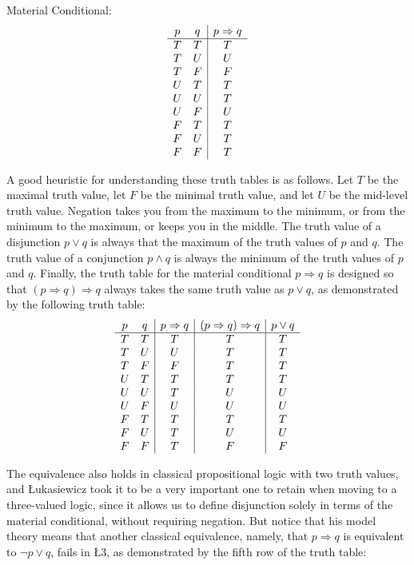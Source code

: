\documentclass[11pt]{article}
\theoremstyle{definition}
\theoremstyle{remark}
\begin{document}
\noindent
Material Conditional:
\[
\begin{array}{c c|c}
p & q & p \Rightarrow q \\
\hline
T & T & T \\
T & U & U \\
T & F & F \\
U & T & T \\
U & U & T \\
U & F & U \\
F & T & T \\
F & U & T \\
F & F & T \\
\end{array}
\]\par
\noindent
A good heuristic for understanding these truth tables is as follows. Let $T$ be the maximal truth value, let $F$ be the minimal truth value, and let $U$ be the mid-level truth value. Negation takes you from the maximum to the minimum, or from the minimum to the maximum, or keeps you in the middle. The truth value of a disjunction $p\vee q$ is always that the maximum of the truth values of $p$ and $q$. The truth value of a conjunction $p\wedge q$ is always the minimum of the truth values of $p$ and $q$. Finally, the truth table for the material conditional $p\Rightarrow q$ is designed so that $(p\Rightarrow q)\Rightarrow q$ always takes the same truth value as $p\vee q$, as demonstrated by the following truth table:
\noindent
\[
\begin{array}{c c|c|c|c}
p & q & p \Rightarrow q & (p \Rightarrow q) \Rightarrow q & p \lor q \\
\hline
T & T & T & T & T \\
T & U & U & T & T \\
T & F & F & T & T \\
U & T & T & T & T \\
U & U & T & U & U \\
U & F & U & U & U \\
F & T & T & T & T \\
F & U & T & U & U \\
F & F & T & F & F \\
\end{array}
\]\par
\noindent
The equivalence also holds in classical propositional logic with two truth values, and Łukasiewicz took it to be a very important one to retain when moving to a three-valued logic, since it allows us to define disjunction solely in terms of the material conditional, without requiring negation. But notice that his model theory means that another classical equivalence, namely, that $p\Rightarrow q$ is equivalent to $\neg p\vee q$, fails in Ł3, as demonstrated by the fifth row of the truth table:
\end{document}
